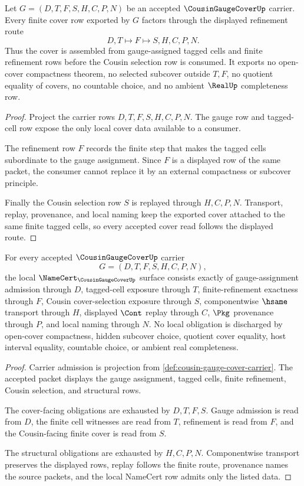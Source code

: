 \begin{theorem}
\label{thm:cousin-gauge-cover-finite-refinement}
Let $G=(D,T,F,S,H,C,P,N)$ be an accepted $\CousinGaugeCoverUp$ carrier. Every finite cover row exported by $G$ factors through the displayed refinement route
$$
D,T \longmapsto F \longmapsto S,H,C,P,N .
$$
Thus the cover is assembled from gauge-assigned tagged cells and finite refinement rows before the Cousin selection row is consumed. It exports no open-cover compactness theorem, no selected subcover outside $T,F$, no quotient equality of covers, no countable choice, and no ambient $\RealUp$ completeness row.
\end{theorem}
\begin{proof}
Project the carrier rows $D,T,F,S,H,C,P,N$. The gauge row and tagged-cell row expose the only local cover data available to a consumer.

The refinement row $F$ records the finite step that makes the tagged cells subordinate to the gauge assignment. Since $F$ is a displayed row of the same packet, the consumer cannot replace it by an external compactness or subcover principle.

Finally the Cousin selection row $S$ is replayed through $H,C,P,N$. Transport, replay, provenance, and local naming keep the exported cover attached to the same finite tagged cells, so every accepted cover read follows the displayed route.
\end{proof}

\begin{theorem}
\label{thm:cousin-gauge-cover-namecert-obligations}
For every accepted $\CousinGaugeCoverUp$ carrier
$$
G=(D,T,F,S,H,C,P,N),
$$
the local $\NameCert_{\CousinGaugeCoverUp}$ surface consists exactly of gauge-assignment admission through $D$, tagged-cell exposure through $T$, finite-refinement exactness through $F$, Cousin cover-selection exposure through $S$, componentwise $\hsame$ transport through $H$, displayed $\Cont$ replay through $C$, $\Pkg$ provenance through $P$, and local naming through $N$. No local obligation is discharged by open-cover compactness, hidden subcover choice, quotient cover equality, host interval equality, countable choice, or ambient real completeness.
\end{theorem}
\begin{proof}
Carrier admission is projection from \autoref{def:cousin-gauge-cover-carrier}. The accepted packet displays the gauge assignment, tagged cells, finite refinement, Cousin selection, and structural rows.

The cover-facing obligations are exhausted by $D,T,F,S$. Gauge admission is read from $D$, the finite cell witnesses are read from $T$, refinement is read from $F$, and the Cousin-facing finite cover is read from $S$.

The structural obligations are exhausted by $H,C,P,N$. Componentwise transport preserves the displayed rows, replay follows the finite route, provenance names the source packets, and the local NameCert row admits only the listed data.
\end{proof}

